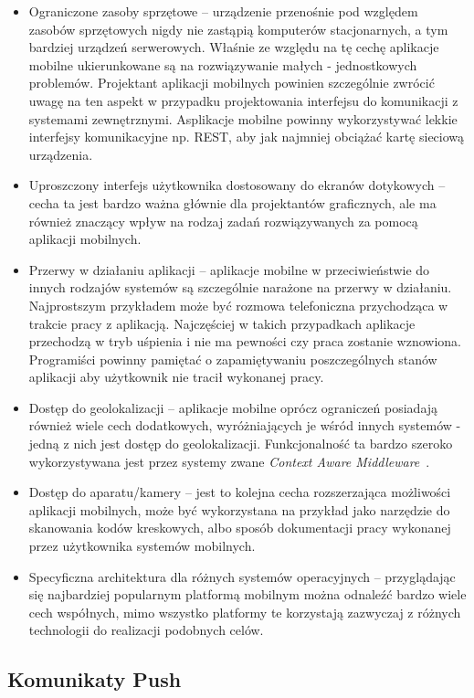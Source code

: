 \begin{itemize}
\item Ograniczone zasoby sprzętowe -- urządzenie przenośnie pod względem zasobów sprzętowych nigdy nie zastąpią komputerów stacjonarnych, a tym bardziej urządzeń serwerowych. Właśnie ze względu na tę cechę aplikacje mobilne ukierunkowane są na rozwiązywanie małych - jednostkowych problemów. Projektant aplikacji mobilnych powinien szczególnie zwrócić uwagę na ten aspekt w przypadku projektowania interfejsu do komunikacji z systemami zewnętrznymi. Asplikacje mobilne powinny wykorzystywać lekkie interfejsy komunikacyjne np. REST, aby jak najmniej obciążać kartę sieciową urządzenia. 
\item Uproszczony interfejs użytkownika dostosowany do ekranów dotykowych -- cecha ta jest bardzo ważna głównie dla projektantów graficznych, ale ma również znaczący wpływ na rodzaj zadań rozwiązywanych za pomocą aplikacji mobilnych.  
\item Przerwy w działaniu aplikacji -- aplikacje mobilne w przeciwieństwie do innych rodzajów systemów są szczególnie narażone na przerwy w działaniu. Najprostszym przykładem może być rozmowa telefoniczna przychodząca w trakcie pracy z aplikacją. Najczęściej w takich przypadkach aplikacje przechodzą w tryb uśpienia i nie ma pewności czy praca zostanie wznowiona. Programiści powinny pamiętać o zapamiętywaniu poszczególnych stanów aplikacji aby użytkownik nie tracił wykonanej pracy. 
\item Dostęp do geolokalizacji -- aplikacje mobilne oprócz ograniczeń posiadają również wiele cech dodatkowych, wyróżniających je wśród innych systemów - jedną z nich jest dostęp do  geolokalizacji.  Funkcjonalność ta bardzo szeroko wykorzystywana jest przez systemy zwane \textit{Context Aware Middleware}~\cite{ContextAwareMobility}. 
\item Dostęp do aparatu/kamery -- jest to kolejna cecha rozszerzająca możliwości aplikacji mobilnych, może być wykorzystana na przykład jako narzędzie do skanowania kodów kreskowych, albo sposób dokumentacji pracy wykonanej przez użytkownika systemów mobilnych. 
\item Specyficzna architektura dla różnych systemów operacyjnych -- przyglądając się najbardziej popularnym platformą mobilnym można odnaleźć bardzo wiele cech współnych, mimo wszystko platformy te korzystają zazwyczaj z różnych technologii do realizacji podobnych celów.
\end{itemize}

\subsection{Komunikaty Push}
\label{sec:push}

